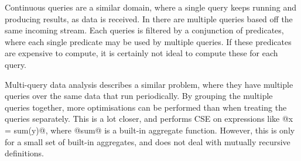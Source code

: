 
% 

Continuous queries are a similar domain, where a single query keeps running and producing results, as data is received.
In \cite{munagala2007optimization} there are multiple queries based off the same incoming stream.
Each queries is filtered by a conjunction of predicates, where each single predicate may be used by multiple queries.
If these predicates are expensive to compute, it is certainly not ideal to compute these for each query.

Multi-query data analysis\cite{andrade2003efficient} describes a similar problem, where they have multiple queries over the same data that run periodically.
By grouping the multiple queries together, more optimisations can be performed than when treating the queries separately.
This is a lot closer, and performs CSE on expressions like @x = sum(y)@, where @sum@ is a built-in aggregate function.
However, this is only for a small set of built-in aggregates, and does not deal with mutually recursive definitions.


% 
